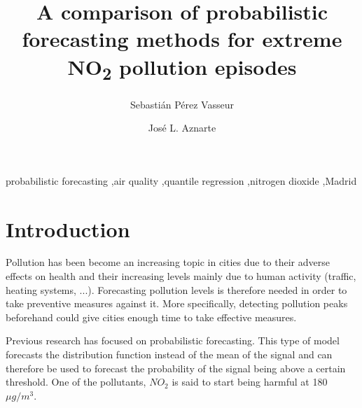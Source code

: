 \documentclass[a4paper,twocolumn,5p]{elsarticle}
\begin{document}
\newcommand{\no}{NO\textsubscript{2}\xspace}

\begin{frontmatter}

\title{A comparison of probabilistic forecasting methods for extreme \no pollution episodes}

\author{Sebasti\'an P\'erez Vasseur} 
\address{Artificial Intelligence Department\\Universidad Nacional de
  Educaci\'on a Distancia --- UNED\\c/ Juan del Rosal, 16, Madrid, Spain}

\author{Jos\'e L. Aznarte}
\address{Artificial Intelligence Department\\Universidad Nacional de
  Educaci\'on a Distancia --- UNED\\c/ Juan del Rosal, 16, Madrid, Spain}



\begin{abstract}

\end{abstract}

\begin{keyword}
probabilistic forecasting \sep air quality \sep quantile regression
\sep nitrogen dioxide \sep Madrid
\end{keyword}

\end{frontmatter}


\section{Introduction}
\label{sec:intro}

Pollution has been become an increasing topic in cities due to their adverse 
effects on health and their increasing levels mainly due to human activity 
(traffic, heating systems, ...). Forecasting pollution levels is therefore needed 
in order to take preventive measures against it. More specifically, detecting pollution 
peaks beforehand could give cities enough time to take effective measures.

Previous research \cite{proba_aznarte} has focused on probabilistic forecasting.
This type of model forecasts the distribution function instead of the mean of the signal 
and can therefore be used to forecast the probability of the signal being above a 
certain threshold. One of the pollutants, $NO_2$ is said to start being harmful at 
180 $\mu g / m^3$. 
\end{document}
